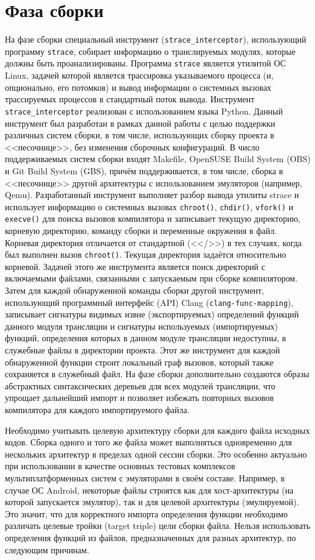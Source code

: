 \section{Фаза сборки}

На фазе сборки специальный инструмент (\texttt{strace\_interceptor}), использующий программу \texttt{strace}, собирает информацию о транслируемых модулях, которые должны быть проанализированы. Программа \texttt{strace} является утилитой ОС Linux, задачей которой является трассировка указываемого процесса (и, опционально, его потомков) и вывод информации о системных вызовах трассируемых процессов в стандартный поток вывода. Инструмент \texttt{strace\_interceptor} реализован с использованием языка Python. Данный инструмент был разработан в рамках данной работы с целью поддержки различных систем сборки, в том числе, использующих сборку проекта в <<песочнице>>, без изменения сборочных конфигураций. В число поддерживаемых систем сборки входят Makefile, OpenSUSE Build System (OBS) и Git Build System (GBS), причём поддерживается, в том числе, сборка в <<песочнице>> другой архитектуры с использованием эмуляторов (например, Qemu). Разработанный инструмент выполняет разбор вывода утилиты strace и использует информацию о системных вызовах \texttt{chroot()}, \texttt{chdir()}, \texttt{vfork()} и \texttt{execve()} для поиска вызовов компилятора и записывает текущую директорию, корневую директорию, команду сборки и переменные окружения в файл. Корневая директория отличается от стандартной (<</>>) в тех случаях, когда был выполнен вызов \texttt{chroot()}. Текущая директория задаётся относительно корневой. Задачей этого же инструмента является поиск директорий с включаемыми файлами, связанными с запускаемым при сборке компилятором. Затем для каждой обнаруженной команды сборки другой инструмент, использующий программный интерфейс (API) Clang (\texttt{clang-func-mapping}), записывает сигнатуры видимых извне (экспортируемых) определений функций данного модуля трансляции и сигнатуры используемых (импортируемых) функций, определения которых в данном модуле трансляции недоступны, в служебные файлы в директории проекта. Этот же инструмент для каждой обнаруженной функции строит локальный граф вызовов, который также сохраняется в служебный файл. На фазе сборки дополнительно создаются образы абстрактных синтаксических деревьев для всех модулей трансляции, что упрощает дальнейший импорт и позволяет избежать повторных вызовов компилятора для каждого импортируемого файла.

Необходимо учитывать целевую архитектуру сборки для каждого файла исходных кодов. Сборка одного и того же файла может выполняться одновременно для нескольких архитектур в пределах одной сессии сборки. Это особенно актуально при использовании в качестве основных тестовых комплексов мультиплатформенных систем с эмуляторами в своём составе. Например, в случае ОС Android, некоторые файлы строятся как для хост-архитектуры (на которой запускается эмулятор), так и для целевой архитектуры (эмулируемой). Это значит, что для корректного импорта определения функции необходимо различать целевые тройки (target triple) цели сборки файла. Нельзя использовать определения функций из файлов, предназначенных для разных архитектур, по следующим причинам.

